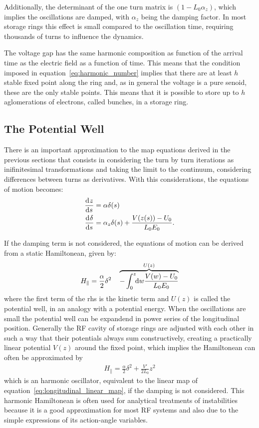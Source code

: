 	Additionally, the determinant of the one turn matrix is $(1-L_0\alpha_z)$, which implies the oscillations are damped, with $\alpha_z$ being the damping factor. In most storage rings this effect is small compared to the oscillation time, requiring thousands of turns to influence the dynamics.

	The voltage gap has the same harmonic composition as function of the arrival time as the electric field as a function of time. This means that the condition imposed in equation~\eqref{eq:harmonic_number} implies that there are at least $h$ stable fixed point along the ring and, as in general the voltage is a pure senoid, these are the only stable points. This means that it is possible to store up to $h$ aglomerations of electrons, called bunches, in a storage ring.

\subsection{The Potential Well}\label{ssec:potential_well}

	There is an important approximation to the map equations derived in the previous sections that consists in considering the turn by turn iterations as inifinitesimal transformations and taking the limit to the continuum, considering differences between turns as derivatives. With this considerations, the equations of motion becomes:
	\begin{align}
		\dertot{z}{s} &= \alpha \delta(s) \\\nonumber
		\dertot{\delta}{s} &= \alpha_z\delta(s) + \frac{V(z(s))-U_0}{L_0E_0}.
	\end{align}

    If the damping term is not considered, the equations of motion can be derived from a static Hamiltonean, given by:
	\begin{align}\label{eq:longitudinal_hamiltonean}
		H_\parallel = \frac\alpha2\delta^2 \quad \overbrace{-
                            \defint{w}{\frac{V(w)-U_0}{L_0E_0}}{0}{z}
                        }^{U(z)}
	\end{align}
	where the first term of the \gls{rhs} is the kinetic term and $U(z)$ is called the potential well, in an analogy with a potential energy. When the oscillations are small the potential well can be expandend in power series of the longitudinal position. Generally the RF cavity of storage rings are adjusted with each other in such a way that their potentials always sum constructively, creating a practically linear potential $V(z)$ around the fixed point, which implies the Hamiltonean can often be approximated by
    \begin{align}\label{eq:quadractic_potential_well}
        H_\parallel = \frac\alpha2\delta^2 + \frac{V'}{2L_0}z^2
    \end{align}
    which is an harmonic oscillator, equivalent to the linear map of equation~\eqref{eq:longitudinal_linear_map}, if the damping is not considered. This harmonic Hamiltonean is often used for analytical treatments of instabilities because it is a good approximation for most RF systems and also due to the simple expressions of its action-angle variables.

